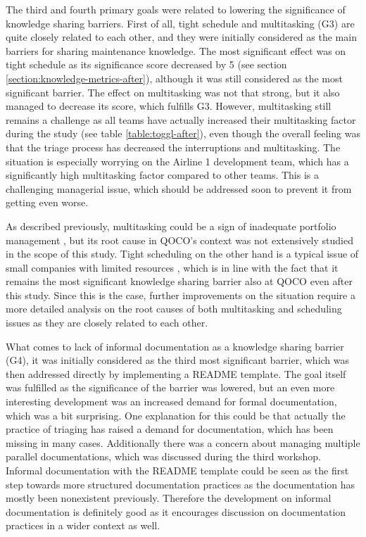 The third and fourth primary goals were related to lowering the significance of knowledge sharing barriers. First of all, tight schedule and multitasking (G3) are quite closely related to each other, and they were
initially considered as the main barriers for sharing maintenance knowledge. The most significant effect was on tight schedule as its significance score decreased by 5
(see section \ref{section:knowledge-metrics-after}), although it was still considered
as the most significant barrier. The effect on multitasking was not that strong, but it also managed to decrease its score, which fulfills G3. However, multitasking still remains a challenge as all teams have
actually increased their multitasking factor during the study (see table \ref{table:toggl-after}), even though the overall feeling was that the triage process has decreased the interruptions and multitasking.
The situation is especially worrying on the Airline 1 development team, which has a significantly high multitasking factor compared to other teams. This is a challenging
managerial issue, which should be addressed soon to prevent it from getting even worse.

As described previously, multitasking could be a sign of inadequate portfolio management \citep{Vahaniitty2010}, but its root cause in QOCO's context was not extensively studied in the scope of this study.
Tight scheduling on the other hand is a typical issue of small companies with limited resources \citep{Kajko-Mattsson2009}, which is in line with the fact that it remains the most significant knowledge sharing
barrier also at QOCO even after this study. Since this is the case, further improvements on the situation require a more detailed analysis on the root causes of both multitasking and scheduling issues
as they are closely related to each other.

What comes to lack of informal documentation as a knowledge sharing barrier (G4), it was initially considered as the third most significant barrier, which was then addressed directly by implementing a README
template. The goal itself was fulfilled as the significance of the barrier was lowered, but an even more interesting development was an increased demand for formal documentation, which was a bit surprising.
One explanation for this could be that actually the practice of triaging has raised a demand for documentation, which has been missing in many cases. Additionally there was a concern
about managing multiple parallel documentations, which was discussed during the third workshop.
Informal documentation with the README template could be seen as the first step towards more structured documentation practices
as the documentation has mostly been nonexistent previously. Therefore the development on informal documentation is definitely good as it encourages discussion on documentation practices in a wider context as well.

